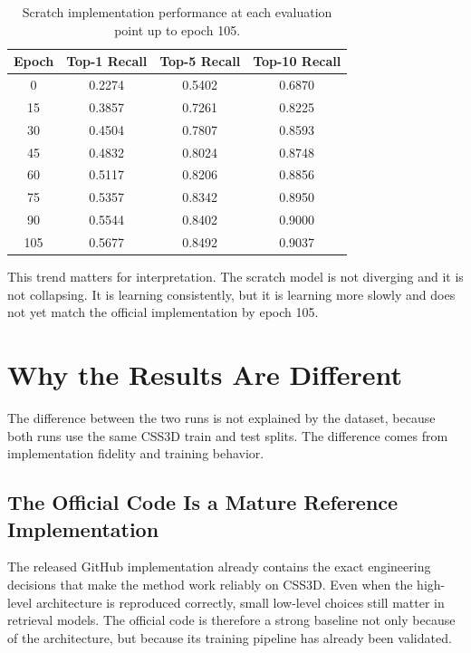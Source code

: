 \documentclass[11pt]{article}
\begin{document}
\begin{table}[h]
\centering
\begin{tabular}{cccc}
\toprule
Epoch & Top-1 Recall & Top-5 Recall & Top-10 Recall \\
\midrule
0 & 0.2274 & 0.5402 & 0.6870 \\
15 & 0.3857 & 0.7261 & 0.8225 \\
30 & 0.4504 & 0.7807 & 0.8593 \\
45 & 0.4832 & 0.8024 & 0.8748 \\
60 & 0.5117 & 0.8206 & 0.8856 \\
75 & 0.5357 & 0.8342 & 0.8950 \\
90 & 0.5544 & 0.8402 & 0.9000 \\
105 & 0.5677 & 0.8492 & 0.9037 \\
\bottomrule
\end{tabular}
\caption{Scratch implementation performance at each evaluation point up to epoch 105.}
\label{tab:scratchtrend}
\end{table}

This trend matters for interpretation. The scratch model is not diverging and it is not collapsing. It is learning consistently, but it is learning more slowly and does not yet match the official implementation by epoch 105.

\section{Why the Results Are Different}
The difference between the two runs is not explained by the dataset, because both runs use the same CSS3D train and test splits. The difference comes from implementation fidelity and training behavior.

\subsection{The Official Code Is a Mature Reference Implementation}
The released GitHub implementation already contains the exact engineering decisions that make the method work reliably on CSS3D. Even when the high-level architecture is reproduced correctly, small low-level choices still matter in retrieval models. The official code is therefore a strong baseline not only because of the architecture, but because its training pipeline has already been validated.
\end{document}
